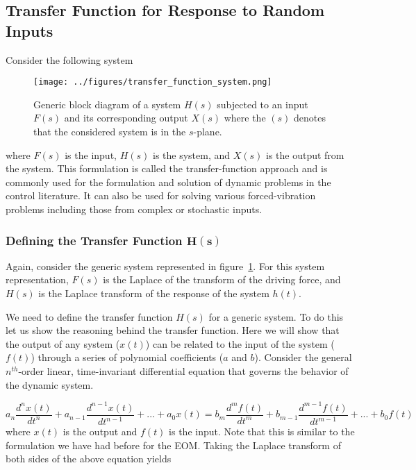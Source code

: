 \documentclass[12pt,letter]{article}
\begin{document}

\subsection{Transfer Function for Response to Random Inputs}

			Consider the following system
			\begin{figure}[H]
				\centering
				\texttt{[image: ../figures/transfer\_function\_system.png]}
				\caption{Generic block diagram of a system $H(s)$ subjected to an input $F(s)$ and its corresponding output $X(s)$ where the $(s)$ denotes that the considered system is in the $s$-plane.}
				\label{fig:transfer_function_system}
			\end{figure}
			\noindent where $F(s)$ is the input, $H(s)$ is the system, and $X(s)$ is the output from the system. This formulation is called the transfer-function approach and is commonly used for the formulation and solution of dynamic problems in the control literature. It can also be used for solving various forced-vibration problems including those from complex or stochastic inputs. 
	
\subsubsection{Defining the Transfer Function $\mathbf{H(s)}$}

Again, consider the generic system represented in figure~\ref{fig:transfer_function_system}. For this system representation, $F(s)$ is the Laplace of the transform of the driving force, and $H(s)$ is the Laplace transform of the response of the system $h(t)$. 

We need to define the transfer function $H(s)$ for a generic system. To do this let us show the reasoning behind the transfer function. Here we will show that the output of any system ($x(t)$) can be related to the input of the system ($f(t)$) through a series of polynomial coefficients ($a$ and $b$). Consider the general $n^{th}$-order linear, time-invariant differential equation that governs the behavior of the dynamic system.

\begin{equation}
a_n\frac{d^nx(t)}{dt^n} + a_{n-1}\frac{d^{n-1}x(t)}{dt^{n-1}} + ... + a_0x(t) = b_m\frac{d^mf(t)}{dt^m} + b_{m-1}\frac{d^{m-1}f(t)}{dt^{m-1}} + ... + b_0f(t)
\end{equation} 
where $x(t)$ is the output and $f(t)$ is the input. Note that this is similar to the formulation we have had before for the EOM. Taking the Laplace transform of both sides of the above equation yields
\end{document}
